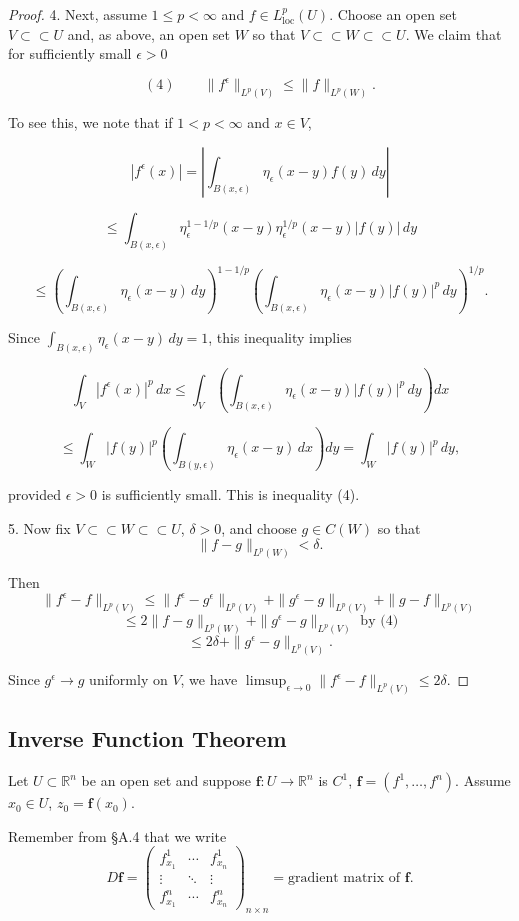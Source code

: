 \begin{proof}
4. Next, assume $1 \leq p < \infty$ and $f \in L^p_{\text{loc}}(U)$. Choose an open set $V \subset\subset U$ and, as above, an open set $W$ so that $V \subset\subset W \subset\subset U$. We claim that for sufficiently small $\epsilon > 0$

$$(4) \qquad \|f^\epsilon\|_{L^p(V)} \leq \|f\|_{L^p(W)}.$$

To see this, we note that if $1 < p < \infty$ and $x \in V$,

$$|f^\epsilon(x)| = \left|\int_{B(x,\epsilon)} \eta_\epsilon(x-y)f(y)\,dy\right|$$

$$\leq \int_{B(x,\epsilon)} \eta_\epsilon^{1-1/p}(x-y)\eta_\epsilon^{1/p}(x-y)|f(y)|\,dy$$

$$\leq \left(\int_{B(x,\epsilon)} \eta_\epsilon(x-y)\,dy\right)^{1-1/p} \left(\int_{B(x,\epsilon)} \eta_\epsilon(x-y)|f(y)|^p\,dy\right)^{1/p}.$$

Since $\int_{B(x,\epsilon)} \eta_\epsilon(x-y)\,dy = 1$, this inequality implies

$$\int_V |f^\epsilon(x)|^p\,dx \leq \int_V \left(\int_{B(x,\epsilon)} \eta_\epsilon(x-y)|f(y)|^p\,dy\right) dx$$

$$\leq \int_W |f(y)|^p \left(\int_{B(y,\epsilon)} \eta_\epsilon(x-y)\,dx\right) dy = \int_W |f(y)|^p\,dy,$$

provided $\epsilon > 0$ is sufficiently small. This is inequality (4).

5. Now fix $V \subset\subset W \subset\subset U$, $\delta > 0$, and choose $g \in C(W)$ so that
$$\|f - g\|_{L^p(W)} < \delta.$$

Then
$$\|f^\epsilon - f\|_{L^p(V)} \leq \|f^\epsilon - g^\epsilon\|_{L^p(V)} + \|g^\epsilon - g\|_{L^p(V)} + \|g - f\|_{L^p(V)}$$
$$\leq 2\|f - g\|_{L^p(W)} + \|g^\epsilon - g\|_{L^p(V)} \text{ by (4)}$$
$$\leq 2\delta + \|g^\epsilon - g\|_{L^p(V)}.$$

Since $g^\epsilon \to g$ uniformly on $V$, we have $\limsup_{\epsilon \to 0} \|f^\epsilon - f\|_{L^p(V)} \leq 2\delta$.
\end{proof}

\subsection{Inverse Function Theorem}

Let $U \subset \mathbb{R}^n$ be an open set and suppose $\mathbf{f} : U \to \mathbb{R}^n$ is $C^1$, $\mathbf{f} = (f^1, \ldots, f^n)$. Assume $x_0 \in U$, $z_0 = \mathbf{f}(x_0)$.

\begin{definition}
\label{def:gradient-matrix-df-square-notation}
Remember from \S A.4 that we write
$$D\mathbf{f} = \begin{pmatrix} f^1_{x_1} & \cdots & f^1_{x_n} \\ \vdots & \ddots & \vdots \\ f^n_{x_1} & \cdots & f^n_{x_n} \end{pmatrix}_{n \times n} = \text{gradient matrix of } \mathbf{f}.$$
\end{definition}


